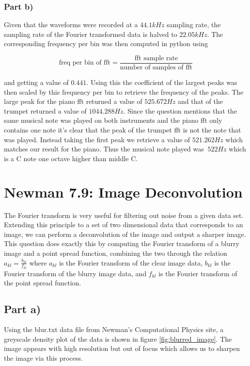 \documentclass{article}
\begin{document}
\subsubsection{Part b)}
Given that the waveforms were recorded at a $44.1kHz$ sampling rate, the sampling rate of the Fourier transformed data is halved to $22.05kHz$. The corresponding frequency per bin was then computed in python using

\begin{equation}
	\text{freq per bin of fft} = \frac{\text{fft sample rate}}{\text{number of samples of fft}}
\end{equation}

and getting a value of $0.441$. Using this the coefficient of the largest peaks was then scaled by this frequency per bin to retrieve the frequency of the peaks. The large peak for the piano fft returned a value of $525.672Hz$ and that of the trumpet returned a value of $1044.288Hz$. Since the question mentions that the same musical note was played on both instruments and the piano fft only contains one note it's clear that the peak of the trumpet fft is not the note that was played. Instead taking the first peak we retrieve a value of $521.262Hz$ which matches our result for the piano. Thus the musical note played was $~522Hz$ which is a C note one octave higher than middle C.


\section{Newman 7.9: Image Deconvolution}
The Fourier transform is very useful for filtering out noise from a given data set. Extending this principle to a set of two dimensional data that corresponds to an image, we can perform a deconvolution of the image and output a sharper image. This question does exactly this by computing the Fourier transform of a blurry image and a point spread function, combining the two through the relation $a_{kl} = \frac{b_{kl}}{f_{kl}}$ where $a_{kl}$ is the Fourier transform of the clear image data, $b_{kl}$ is the Fourier transform of the blurry image data, and $f_{kl}$ is the Fourier transform of the point spread function.

\subsection{Part a)}
Using the blur.txt data file from Newman's Computational Physics site, a greyscale density plot of the data is shown in figure \ref{fig:blurred_image}. The image appears with high resolution but out of focus which allows us to sharpen the image via this process.
\end{document}
